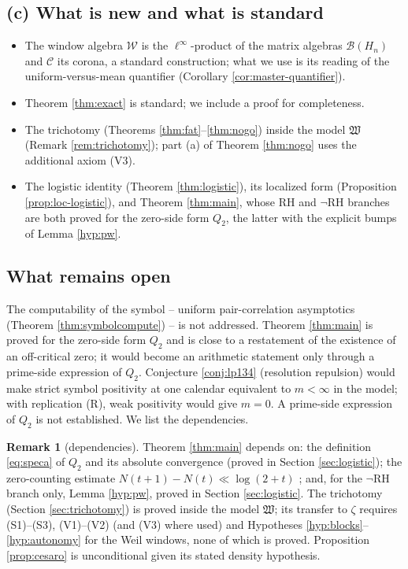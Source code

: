 \documentclass[11pt,reqno]{amsart}
\theoremstyle{definition}
\newtheorem{remark}[theorem]{Remark}
\newcommand{\W}{\mathcal{W}}
\newcommand{\Cor}{\mathcal{C}}
\begin{document}
\subsection{(c) What is new and what is standard}
\begin{itemize}
\item The window algebra \(\W\) is the \(\ell^\infty\)-product of the matrix
algebras \(\mathcal B(H_n)\) and \(\Cor\) its corona, a standard construction;
what we use is its reading of the uniform-versus-mean quantifier (Corollary
\ref{cor:master-quantifier}).
\item Theorem \ref{thm:exact} is standard; we include a proof for completeness.
\item The trichotomy (Theorems \ref{thm:fat}--\ref{thm:nogo}) inside the model
\(\mathfrak W\) (Remark \ref{rem:trichotomy}); part (a) of Theorem
\ref{thm:nogo} uses the additional axiom (V3).
\item The logistic identity (Theorem \ref{thm:logistic}), its localized form
(Proposition \ref{prop:loc-logistic}), and Theorem \ref{thm:main}, whose RH
and \(\neg\)RH branches are both proved for the zero-side form \(Q_2\), the
latter with the explicit bumps of Lemma \ref{hyp:pw}.
\end{itemize}

\subsection{What remains open}
The computability of the symbol -- uniform pair-correlation asymptotics (Theorem
\ref{thm:symbolcompute}) -- is not addressed. Theorem \ref{thm:main} is
proved for the zero-side form \(Q_2\) and is close to a restatement of the
existence of an off-critical zero; it would become an arithmetic statement only
through a prime-side expression of \(Q_2\).
Conjecture \ref{conj:lp134} (resolution repulsion) would make strict symbol
positivity at one calendar equivalent to \(m<\infty\) in the model; with
replication (R), weak positivity would give \(m=0\). A prime-side expression of \(Q_2\) is not
established. We list the dependencies.

\begin{remark}[dependencies]\label{rem:deps}
\textup{Theorem \ref{thm:main}} depends on: the definition \eqref{eq:speca} of
\(Q_2\) and its absolute convergence (proved in Section \ref{sec:logistic});
the zero-counting estimate \(N(t+1)-N(t)\ll\log(2+t)\)
\cite[Thm.~5.8]{IwaniecKowalski}; and, for the \(\neg\)RH branch only,
Lemma \ref{hyp:pw}, proved in Section \ref{sec:logistic}. \textup{The trichotomy (Section
\ref{sec:trichotomy})} is proved inside the model \(\mathfrak W\); its transfer
to \(\zeta\) requires (S1)--(S3), (V1)--(V2) (and (V3) where used) and
Hypotheses \ref{hyp:blocks}--\ref{hyp:autonomy} for the Weil windows, none of
which is proved. \textup{Proposition \ref{prop:cesaro}} is unconditional given
its stated density hypothesis.
\end{remark}
\end{document}
